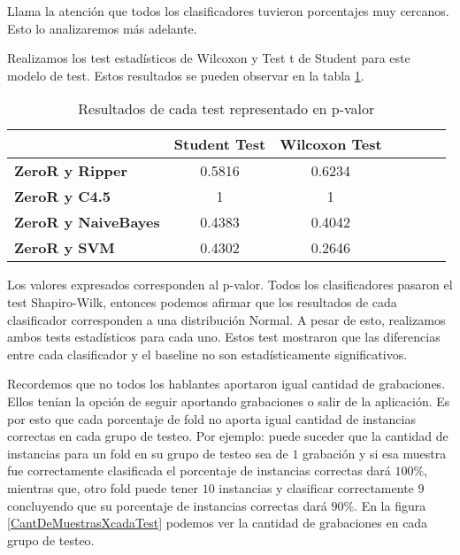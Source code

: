 Llama la atención que todos los clasificadores tuvieron porcentajes muy cercanos. Esto lo analizaremos más adelante. 

Realizamos los test estadísticos de Wilcoxon y Test t de Student para este modelo de test. Estos resultados se pueden observar en la tabla  \ref{HPTDT_res_tests_wilcoxon_student}.

\begin{table}[H]
	\centering
	\begin{tabular}{|l|c|c|c|c|c|c|}
		\hline
		\textbf{}  & \textbf{Student Test} & \textbf{Wilcoxon Test} \\ \hline
		\textbf{ZeroR y Ripper}  & 0.5816 & 0.6234 \\ \hline
		\textbf{ZeroR y C4.5}  & 1 & 1 \\ \hline
		\textbf{ZeroR y NaiveBayes}  & 0.4383 & 0.4042 \\ \hline
		\textbf{ZeroR y SVM}  & 0.4302 & 0.2646 \\ \hline
	\end{tabular}
	\caption{Resultados de cada test representado en p-valor}
	\label{HPTDT_res_tests_wilcoxon_student}
\end{table}

Los valores expresados corresponden al p-valor. Todos los clasificadores pasaron el test Shapiro-Wilk, entonces podemos afirmar que los resultados de cada clasificador corresponden a una distribución Normal. A pesar de esto, realizamos ambos tests estadísticos para cada uno. Estos test mostraron que las diferencias entre cada clasificador y el baseline no son estadísticamente significativos.

Recordemos que no todos los hablantes aportaron igual cantidad de grabaciones. Ellos tenían la opción de seguir aportando grabaciones o salir de la aplicación. Es por esto que cada porcentaje de fold no aporta igual cantidad de instancias correctas en cada grupo de testeo. Por ejemplo: puede suceder que la cantidad de instancias para un fold en su grupo de testeo sea de $1$ grabación y si esa muestra fue correctamente clasificada el porcentaje de instancias correctas dará $100\%$, mientras que, otro fold puede tener $10$ instancias y clasificar correctamente $9$ concluyendo que su porcentaje de instancias correctas dará $90\%$. En la figura \ref{CantDeMuestrasXcadaTest} podemos ver la cantidad de grabaciones en cada grupo de testeo. 

